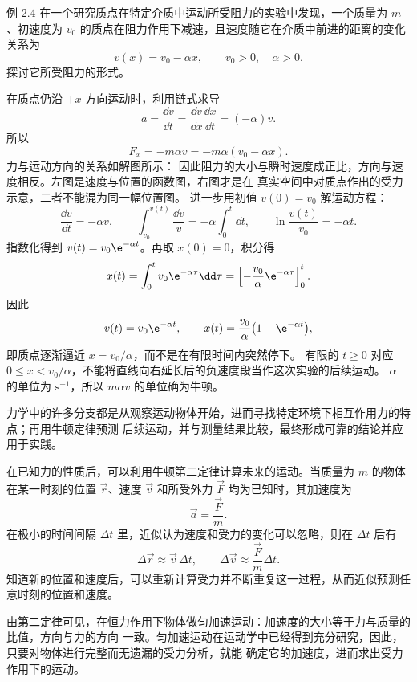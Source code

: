 \begin{origexamplebox}{例 2.4}
在一个研究质点在特定介质中运动所受阻力的实验中发现，一个质量为 $m$、初速度为 $v_0$
的质点在阻力作用下减速，且速度随它在介质中前进的距离的变化关系为
\[
  v(x)=v_0-\alpha x,\qquad v_0>0,\quad\alpha>0.
\]
探讨它所受阻力的形式。
\end{origexamplebox}

\begin{xesolution}
在质点仍沿 $+x$ 方向运动时，利用链式求导
\[
  a=\frac{\dd v}{\dd t}
  =\frac{\dd v}{\dd x}\frac{\dd x}{\dd t}
  =(-\alpha)v.
\]
所以
\[
  \boxed{F_x=-m\alpha v=-m\alpha(v_0-\alpha x)}.
\]
力与运动方向的关系如解图所示：
\soldiagTwoFour
因此阻力的大小与瞬时速度成正比，方向与速度相反。左图是速度与位置的函数图，右图才是在
真实空间中对质点作出的受力示意，二者不能混为同一幅位置图。
进一步用初值 $v(0)=v_0$ 解运动方程：
\[
 \frac{\dd v}{\dd t}=-\alpha v,
 \qquad\int_{v_0}^{v(t)}\frac{\dd v}{v}=-\alpha\int_0^t\dd t,
 \qquad\ln\frac{v(t)}{v_0}=-\alpha t.
\]
指数化得到 $v(t)=v_0\e^{-\alpha t}$。再取 $x(0)=0$，积分得
\[
 x(t)=\int_0^t v_0\e^{-\alpha\tau}\dd\tau
 =\left[-\frac{v_0}{\alpha}\e^{-\alpha\tau}\right]_0^t.
\]
因此
\[
  v(t)=v_0\e^{-\alpha t},
  \qquad
  x(t)=\frac{v_0}{\alpha}\bigl(1-\e^{-\alpha t}\bigr),
\]
即质点逐渐逼近 $x=v_0/\alpha$，而不是在有限时间内突然停下。
有限的 $t\ge0$ 对应 $0\le x<v_0/\alpha$，不能将直线向右延长后的负速度段当作这次实验的后续运动。
$\alpha$ 的单位为 $\mathrm{s^{-1}}$，所以 $m\alpha v$ 的单位确为牛顿。
\end{xesolution}

力学中的许多分支都是从观察运动物体开始，进而寻找特定环境下相互作用力的特点；再用牛顿定律预测
后续运动，并与测量结果比较，最终形成可靠的结论并应用于实践。

在已知力的性质后，可以利用牛顿第二定律计算未来的运动。当质量为 $m$ 的物体在某一时刻的位置
$\vec r$、速度 $\vec v$ 和所受外力 $\vec F$ 均为已知时，其加速度为
\begin{equation}
  \vec a=\frac{\vec F}{m}.
\end{equation}
在极小的时间间隔 $\Delta t$ 里，近似认为速度和受力的变化可以忽略，则在 $\Delta t$ 后有
\begin{equation}
  \Delta\vec r\approx\vec v\,\Delta t,
  \qquad
  \Delta\vec v\approx\frac{\vec F}{m}\Delta t.
\end{equation}
知道新的位置和速度后，可以重新计算受力并不断重复这一过程，从而近似预测任意时刻的位置和速度。

由第二定律可见，在恒力作用下物体做匀加速运动：加速度的大小等于力与质量的比值，方向与力的方向
一致。匀加速运动在运动学中已经得到充分研究，因此，只要对物体进行完整而无遗漏的受力分析，就能
确定它的加速度，进而求出受力作用下的运动。

